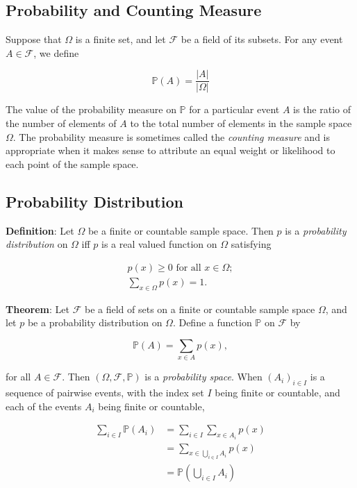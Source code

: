 \documentclass[12pt]{article}
\newcommand{\prob}[1]{\mathbb{P}(#1)}
\newcommand{\field}{\mathcal{F}}
\begin{document}
\subsection*{Probability and Counting Measure}
\noindent
Suppose that $\Omega$ is a finite set, and let $\field$ be a field of its subsets. For any event $A \in \field$, we define

\begin{equation*}
\prob{A} = \frac{\lvert A \rvert}{\lvert \Omega \rvert}
\end{equation*}

\noindent
The value of the probability measure on $\mathbb{P}$ for a particular event $A$ is the ratio of the number of elements of $A$ to the total number of elements in the sample space $\Omega$. The probability measure is sometimes called the \textit{counting measure} and is appropriate when it makes sense to attribute an equal weight or likelihood to each point of the sample space.
\subsection*{Probability Distribution}

\noindent
\textbf{Definition}: Let $\Omega$ be a finite or countable sample space. Then $p$ is a \textit{probability distribution} on $\Omega$ iff $p$ is a real valued function on $\Omega$ satisfying

\begin{align*}
p(x) \geq 0 \text{ for all } x \in \Omega; \\
\sum_{x \in \Omega} p(x) = 1.
\end{align*}

\noindent
\textbf{Theorem}: Let $\field$ be a field of sets on a finite or countable sample space $\Omega$, and let $p$ be a probability distribution on $\Omega$. Define a function $\mathbb{P}$ on $\field$ by

\begin{equation}
\mathbb{P}(A) = \sum_{x \in A} p(x),
\end{equation}

\noindent
for all $A \in \field$. Then $(\Omega, \field, \mathbb{P})$ is a \textit{probability space}. When $(A_i)_{i \in I}$ is a sequence of pairwise events, with the index set $I$ being finite or countable, and each of the events $A_i$ being finite or countable, 

\begin{align*}
\sum_{i \in I} \mathbb{P}(A_i) & = \sum_{i \in I} \sum_{x \in A_i} p(x) \\
& = \sum_{x \in \bigcup_{i \in I} A_i} p(x) \\
& = \mathbb{P}(\bigcup_{i \in I} A_i)
\end{align*}
\end{document}

